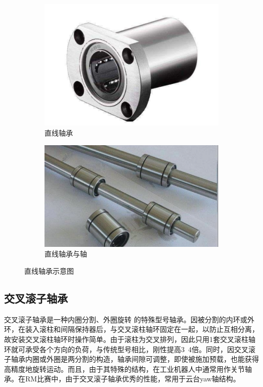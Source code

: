 \documentclass[UTF8]{article} %
\begin{document}
\begin{figure}[H]
  \centering
  \begin{subfigure}[b]{0.3\textwidth}
         \centering
         \includegraphics[width=\textwidth]{zhou6.png}
          \caption{直线轴承}
  \end{subfigure}
  \quad
  \begin{subfigure}[b]{0.35\textwidth}
          \centering
          \includegraphics[width=\textwidth]{zhou7.png}
          \caption{直线轴承与轴}
  \end{subfigure}
  \caption{直线轴承示意图}
\end{figure}

\subsection{交叉滚子轴承}
交叉滚子轴承是一种内圈分割、外圈旋转 的特殊型号轴承。因被分割的内环或外环，在装入滚柱和间隔保持器后，与交叉滚柱轴环固定在一起，以防止互相分离，故安装交叉滚柱轴环时操作简单。由于滚柱为交叉排列，因此只用1套交叉滚柱轴环就可承受各个方向的负荷，与传统型号相比，刚性提高3~4倍。同时，因交叉滚子轴承内圈或外圈是两分割的构造，轴承间隙可调整，即使被施加预载，也能获得高精度地旋转运动。而且，由于其特殊的结构，在工业机器人中通常用作关节轴承。在RM比赛中，由于交叉滚子轴承优秀的性能，常用于云台yaw轴结构。
\end{document}
